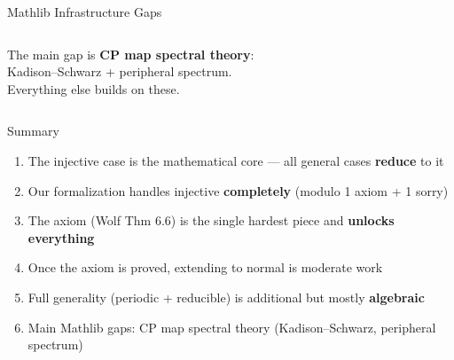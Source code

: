 \documentclass[aspectratio=169,10pt]{beamer}
\begin{document}
\begin{frame}{Mathlib Infrastructure Gaps}
\begin{columns}[T]
        \vspace{0.4em}
        \colorbox{cardbg}{\parbox{0.93\columnwidth}{\centering\scriptsize
        \textcolor{dimwhite}{The main gap is \textbf{CP map spectral theory}:\\
        Kadison--Schwarz + peripheral spectrum.\\
        Everything else builds on these.}}}
    \end{columns}
\end{frame}

\begin{frame}{Summary}
    \vspace{-0.3em}

    \begin{enumerate}\itemsep0.3em\small
        \item The \textcolor{amber}{injective case} is the mathematical core ---
              all general cases \textbf{reduce} to it
        \item Our formalization handles injective \textbf{completely}
              (modulo 1 axiom + 1 sorry)
        \item The \textcolor{softred}{axiom} (Wolf Thm 6.6) is the single
              hardest piece and \textbf{unlocks everything}
        \item Once the axiom is proved, extending to
              \textcolor{leangreen}{normal} is moderate work
        \item Full generality (\textcolor{leanblue}{periodic} +
              \textcolor{softred}{reducible}) is additional but mostly
              \textbf{algebraic}
        \item Main Mathlib gaps: CP map spectral theory
              (Kadison--Schwarz, peripheral spectrum)
    \end{enumerate}

    \vspace{0.5em}
    \begin{center}
\end{center}
\end{frame}
\end{document}
